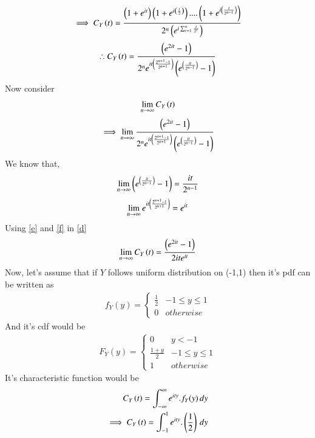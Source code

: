 \documentclass[journal,12pt,twocolumn]{IEEEtran}
\begin{document}
\begin{align}
    \implies C_{Y}\left(t\right)=\frac{\left(1+e^{it}\right)\left(1+e^{i\left(\frac{t}{2}\right)}\right)....\left(1+e^{i\left(\frac{t}{2^{n-1}}\right)}\right)}{2^n\left(e^{i\sum_{r=1}^n\frac{t}{2^r}}\right)}
\end{align}
\begin{align}
     \therefore C_{Y}\left(t\right)=\frac{\left(e^{2it}-1\right)}{2^ne^{it\left(\frac{2^{n+1}-1}{2^{n+1}}\right)}\left(e^{\left(\frac{it}{2^{n-1}}\right)}-1\right)}
     \label{c}
\end{align}
Now consider
\begin{align}
     \lim_{n\to\infty} C_{Y}\left(t\right)
\end{align}
\begin{align}
    \implies \lim_{n\to\infty}\frac{\left(e^{2it}-1\right)}{2^ne^{it\left(\frac{2^{n+1}-1}{2^{n+1}}\right)}\left(e^{\left(\frac{it}{2^{n-1}}\right)}-1\right)}
    \label{d}
\end{align}
We know that,
\begin{align}
    \lim_{n\to\infty}\left(e^{\left(\frac{it}{2^{n-1}}\right)}-1\right) = \frac{it}{2^{n-1}}
    \label{e}
\end{align}
\begin{align}
    \lim_{n\to\infty}e^{it\left(\frac{2^{n+1}-1}{2^{n+1}}\right)}=e^{it}
    \label{f}
\end{align}
Using \eqref{e} and \eqref{f} in \eqref{d}
\begin{align}
    \lim_{n\to\infty} C_{Y}\left(t\right)=\frac{\left(e^{2it}-1\right)}{2ite^{it}}
    \label{g}
\end{align}
Now, let's assume that if $Y$ follows uniform distribution on (-1,1) then it's pdf can be written as
\begin{align}
    f_{Y}(y)=\begin{cases} 
            \frac{1}{2}  &  -1\le y\le 1\\
            0 &  otherwise
            \end{cases}
\end{align}
And it's cdf would be
\begin{align}
    F_{Y}(y)=\begin{cases} 
            0 & y<-1\\
            \frac{1+y}{2}  &  -1\le y\le 1\\
            1 &  otherwise
            \end{cases}
\end{align}
It's characteristic function would be 
\begin{align}
   C_{Y}\left(t\right)= \int_{-\infty}^{\infty} e^{ity}.f_{Y}(y) \,dy\\
    \implies C_{Y}\left(t\right)=\int_{-1}^{1} e^{ity}.\left(\frac{1}{2}\right) \,dy
\end{align}
\end{document}

